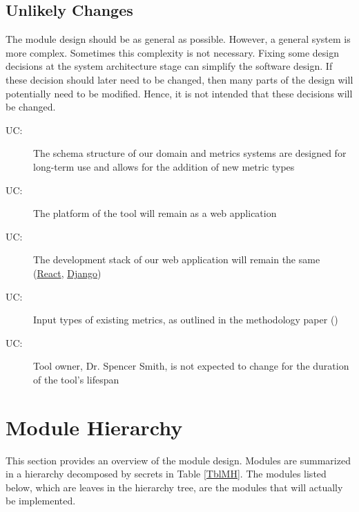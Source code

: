 \documentclass[12pt, titlepage]{article}
\newcounter{ucnum}
\newcommand{\uctheucnum}{UC\theucnum}
\begin{document}
\subsection{Unlikely Changes} \label{SecUchange}

The module design should be as general as possible. However, a general system is
more complex. Sometimes this complexity is not necessary. Fixing some design
decisions at the system architecture stage can simplify the software design. If
these decision should later need to be changed, then many parts of the design
will potentially need to be modified. Hence, it is not intended that these
decisions will be changed.

\begin{description}
  \item[ \uctheucnum \label{uc1}:] The schema structure of our domain and metrics systems are designed for long-term use and allows for the addition of new metric types
  \item[ \uctheucnum \label{uc2}:] The platform of the tool will remain as a web application
  \item[ \uctheucnum \label{uc3}:] The development stack of our web application will remain the same (\href{https://react.dev/}{React}, \href{https://www.djangoproject.com/}{Django})
  \item[ \uctheucnum \label{uc4}:] Input types of existing metrics, as outlined in the methodology paper (\citet{MethodologyPaper})
  \item[ \uctheucnum \label{uc5}:] Tool owner, Dr. Spencer Smith, is not expected to change for the duration of the tool's lifespan
\end{description}

\section{Module Hierarchy} \label{SecMH}

This section provides an overview of the module design. Modules are summarized
in a hierarchy decomposed by secrets in Table \ref{TblMH}. The modules listed
below, which are leaves in the hierarchy tree, are the modules that will
actually be implemented.
\end{document}
